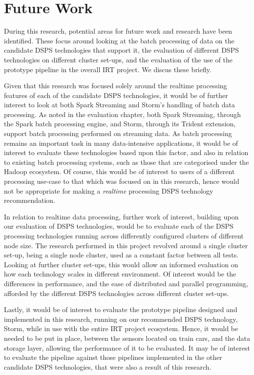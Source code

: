 \section{Future Work} %
\label{sub:future_work}

During this research, potential areas for future work and research have been identified. These focus around looking at
the batch processing of data on the candidate DSPS technologies that support it, the evaluation of different DSPS technologies on different
cluster set-ups, and the evaluation of the use of the prototype pipeline in the overall IRT project. We discus these briefly.

Given that this research was focused solely around the realtime processing features of each of the candidate DSPS technologies,
it would be of further interest to look at both Spark Streaming and Storm's handling of batch data processing. As noted
in the evaluation chapter, both Spark Streaming, through the Spark batch processing engine, and Storm, through its
Trident extension, support batch processing performed on streaming data. As batch processing remains an important task
in many data-intensive applications, it would be of interest to evaluate these technologies based upon this factor, and also in relation
to existing batch processing systems, such as those that are categorised under the Hadoop ecosystem. Of course, this would
be of interest to users of a different processing use-case to that which was focused on in this research, hence would
not be appropriate for making a \textit{realtime} processing DSPS technology recommendation.

In relation to realtime data processing, further work of interest, building upon our evaluation of DSPS technologies, would
be to evaluate each of the DSPS processing technologies running across differently configured clusters of different node size.
The research performed in this project revolved around a single cluster set-up, being a single node cluster, used as a constant factor between all
tests. Looking at further cluster set-ups, this would allow an informed evaluation on how each technology scales in different environment.
Of interest would be the differences in performance, and the ease of distributed and parallel programming, afforded by the different DSPS technologies across
different cluster set-ups.

Lastly, it would be of interest to evaluate the prototype pipeline designed and implemented in this research, running on our recommended
DSPS technology, Storm, while in use with the entire IRT project ecosystem. Hence, it would be needed to be put in place,
between the sensors located on train cars, and the data storage layer, allowing the performance of it to be evaluated.
It may be of interest to evaluate the pipeline against those pipelines implemented in the other candidate DSPS technologies,
that were also a result of this research.

